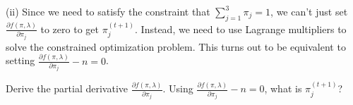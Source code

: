 \documentclass[12pt, addpoints]{exam}
\begin{document}
\begin{questions}
\begin{parts}
(ii) Since we need to satisfy the constraint that $\sum_{j = 1}^3 \pi_j = 1$, we can't just set $\frac{\partial f(\pi, \lambda)}{\partial \pi_j}$ to zero to get $\pi_j^{(t + 1)}$. Instead, we need to use Lagrange multipliers to solve the constrained optimization problem. This turns out to be equivalent to setting $\frac{\partial f(\pi, \lambda)}{\partial \pi_j} - n = 0$.

Derive the partial derivative $\frac{\partial f(\pi, \lambda)}{\partial \pi_j}$. Using $\frac{\partial f(\pi, \lambda)}{\partial \pi_j} - n = 0$, what is $\pi^{(t + 1)}_j$?

 
\end{parts}

\end{questions}
\end{document}

